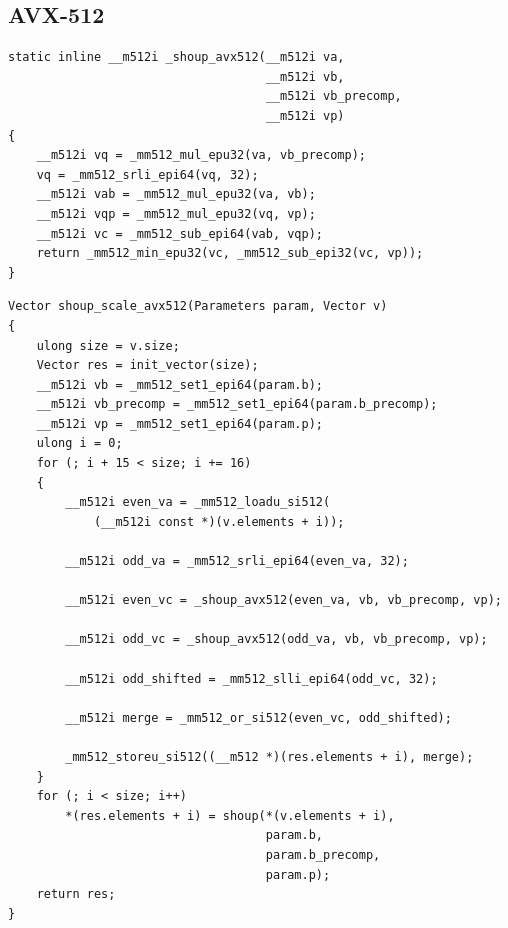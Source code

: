 \documentclass{article}
\begin{document}
\subsection{AVX-512}
\begin{lstlisting}[caption = Auxiliary function of Shoup's modular reduction]
static inline __m512i _shoup_avx512(__m512i va,
                                    __m512i vb,
                                    __m512i vb_precomp,
                                    __m512i vp)
{
    __m512i vq = _mm512_mul_epu32(va, vb_precomp);
    vq = _mm512_srli_epi64(vq, 32);
    __m512i vab = _mm512_mul_epu32(va, vb);
    __m512i vqp = _mm512_mul_epu32(vq, vp);
    __m512i vc = _mm512_sub_epi64(vab, vqp);
    return _mm512_min_epu32(vc, _mm512_sub_epi32(vc, vp));
}
\end{lstlisting}

\begin{lstlisting}[caption = Implementation of Shoup's modular reduction]
Vector shoup_scale_avx512(Parameters param, Vector v)
{
    ulong size = v.size;
    Vector res = init_vector(size);
    __m512i vb = _mm512_set1_epi64(param.b);
    __m512i vb_precomp = _mm512_set1_epi64(param.b_precomp);
    __m512i vp = _mm512_set1_epi64(param.p);
    ulong i = 0;
    for (; i + 15 < size; i += 16)
    {
        __m512i even_va = _mm512_loadu_si512(
            (__m512i const *)(v.elements + i));

        __m512i odd_va = _mm512_srli_epi64(even_va, 32);

        __m512i even_vc = _shoup_avx512(even_va, vb, vb_precomp, vp);

        __m512i odd_vc = _shoup_avx512(odd_va, vb, vb_precomp, vp);

        __m512i odd_shifted = _mm512_slli_epi64(odd_vc, 32);

        __m512i merge = _mm512_or_si512(even_vc, odd_shifted);

        _mm512_storeu_si512((__m512 *)(res.elements + i), merge);
    }
    for (; i < size; i++)
        *(res.elements + i) = shoup(*(v.elements + i),
                                    param.b,
                                    param.b_precomp,
                                    param.p);
    return res;
}
\end{lstlisting}
\end{document}
